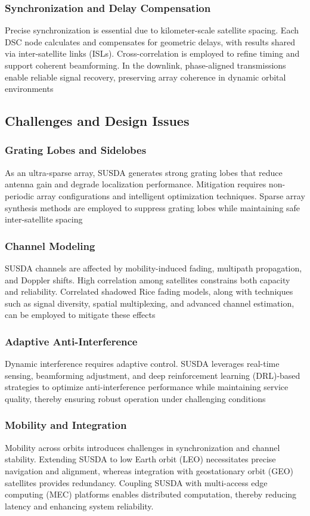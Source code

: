 \documentclass[conference]{IEEEtran}
\begin{document}
\subsubsection{Synchronization and Delay Compensation} \label{sec4.2.3}
Precise synchronization is essential due to kilometer-scale satellite spacing. Each DSC node calculates and compensates for geometric delays, with results shared via inter-satellite links (ISLs). Cross-correlation is employed to refine timing and support coherent beamforming. In the downlink, phase-aligned transmissions enable reliable signal recovery, preserving array coherence in dynamic orbital environments

\subsection{Challenges and Design Issues} \label{sec4.3}
\subsubsection{Grating Lobes and Sidelobes} \label{sec4.3.1}
As an ultra-sparse array, SUSDA generates strong grating lobes that reduce antenna gain and degrade localization performance. Mitigation requires non-periodic array configurations and intelligent optimization techniques. Sparse array synthesis methods are employed to suppress grating lobes while maintaining safe inter-satellite spacing

\subsubsection{Channel Modeling} \label{sec4.3.2}
SUSDA channels are affected by mobility-induced fading, multipath propagation, and Doppler shifts. High correlation among satellites constrains both capacity and reliability. Correlated shadowed Rice fading models, along with techniques such as signal diversity, spatial multiplexing, and advanced channel estimation, can be employed to mitigate these effects  
\subsubsection{Adaptive Anti-Interference} \label{sec4.3.3}
Dynamic interference requires adaptive control. SUSDA leverages real-time sensing, beamforming adjustment, and deep reinforcement learning (DRL)-based strategies to optimize anti-interference performance while maintaining service quality, thereby ensuring robust operation under challenging conditions
\subsubsection{Mobility and Integration} \label{sec4.3.4}
Mobility across orbits introduces challenges in synchronization and channel stability. Extending SUSDA to low Earth orbit (LEO) necessitates precise navigation and alignment, whereas integration with geostationary orbit (GEO) satellites provides redundancy. Coupling SUSDA with multi-access edge computing (MEC) platforms enables distributed computation, thereby reducing latency and enhancing system reliability.
\end{document}
